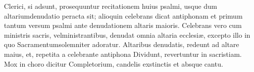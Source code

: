 {\color{red} Clerici, si adsunt, prosequuntur recitationem huius psalmi, usque dum
altariumdenudatio peracta sit; alioquin celebrans dicat antiphonam et primum
tantum versum psalmi ante denudationem altaris maioris. Celebrans vero cum
ministris sacris, velministrantibus, denudat omnia altaria ecclesiæ, excepto
illo in quo Sacramentumsolemniter adoratur. Altaribus denudatis, redeunt ad
altare maius, et, repetita a celebrante antiphona Dividunt, revertuntur in
sacristiam. Mox in choro dicitur Completorium, candelis exstinctis et absque
cantu.}


% 



